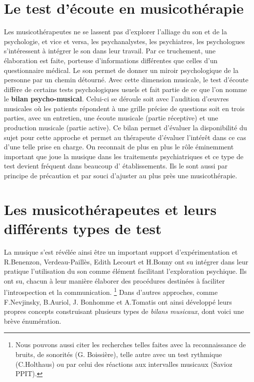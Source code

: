\section{Le test d'écoute en musicothérapie}

Les musicothérapeutes ne se lassent pas d'explorer l'alliage du son
 et de la psychologie, et vice
 et versa, les psychanalystes, les psychiatres, les psychologues
 s'intéressent à intégrer le son dans leur travail. Par ce truchement,
 une élaboration est faite, porteuse d'informations différentes que
 celles d'un questionnaire médical. Le son permet de donner un miroir
 psychologique de la personne par un chemin détourné. Avec cette dimension
 musicale, le test d'écoute diffère de certains tests psychologiques usuels
 et fait partie de ce que l'on nomme le \textbf{ bilan
   psycho-musical}. Celui-ci se déroule soit avec l'audition d'\oe uvres
 musicales où les patients répondent à une grille précise de questions
  soit en trois parties, avec un entretien,
 une écoute musicale (partie réceptive) et une production musicale
 (partie active).
Ce bilan permet d'évaluer la disponibilité du sujet pour cette
approche et permet au thérapeute d'évaluer l'intérêt dans ce cas
d'une telle prise en charge.
 On reconnait de plus en plus le rôle éminemment important que joue la musique
 dans les traitements psychiatriques et ce type de test devient
 fréquent dans beaucoup d' établissements. Ils le sont aussi par principe de précaution et
 par souci d'ajuster au plus près une
 musicothérapie.



  
\section{Les musicothérapeutes et leurs différents types de test}
\label{musicothEtpsycho}

	 La musique s'est révélée ainsi être un important support
         d'expérimentation et 
	 R.Benenzon,  Verdeau-Paillès, Edith
         Lecourt et H.Bonny ont su intégrer dans leur pratique l'utilisation du son comme
         élément facilitant l'exploration psychique.
         Ils ont su, chacun à leur manière  élaborer des procédures destinées à faciliter
         l'introspection et la communication.
\footnote{Nous pouvons aussi citer les recherches telles faites avec la reconnaissance de
bruits, de sonorités (G. Boissière), telle autre avec un test rythmique
(C.Holthaus) ou par celui
des réactions aux intervalles musicaux (Savioz PPIT).} 
Dans d'autres approches, comme F.Nevjinsky, B.Auriol, J. Bonhomme
           et A.Tomatis ont ainsi développé leurs propres
           concepts construisant plusieurs types de \emph{bilans musicaux},
           dont voici une brève énumération.
           

